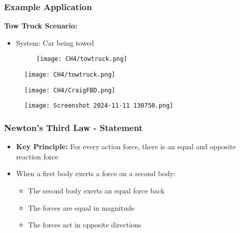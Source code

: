 \documentclass{beamer}
\begin{document}
\begin{frame}
\frametitle{Example Application}
\textbf{Tow Truck Scenario:}
\begin{itemize}
    \item System: Car being towed
\begin{figure}[H]
    \centering
    \texttt{[image: CH4/towtruck.png]}
\end{figure}
\end{itemize}

\end{frame}

\begin{frame}
\begin{figure}[H]
    \centering
    \texttt{[image: CH4/towtruck.png]}
\end{figure}

\begin{figure}[H]
    \centering
    \texttt{[image: CH4/CraigFBD.png]}
\end{figure}
\end{frame}


\begin{frame}
\begin{figure}
    \centering
    \texttt{[image: Screenshot 2024-11-11 130750.png]}
\end{figure}
\end{frame}


\begin{frame}
\frametitle{Newton's Third Law - Statement}
\begin{itemize}
    \item \textbf{Key Principle:} For every action force, there is an equal and opposite reaction force
    \item When a first body exerts a force on a second body:
    \begin{itemize}
        \item The second body exerts an equal force back
        \item The forces are equal in magnitude
        \item The forces act in opposite directions
    \end{itemize}
\end{itemize}
\end{frame}
\end{document}
